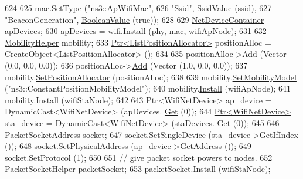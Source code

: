 \begin{DoxyCode}
624 
625   mac.\hyperlink{classns3_1_1WifiMacHelper_a382d8df76a1dd7007179d1963b4b6bc6}{SetType} (\textcolor{stringliteral}{"ns3::ApWifiMac"},
626                \textcolor{stringliteral}{"Ssid"}, SsidValue (ssid),
627                \textcolor{stringliteral}{"BeaconGeneration"}, \hyperlink{classns3_1_1BooleanValue}{BooleanValue} (\textcolor{keyword}{true}));
628 
629   \hyperlink{classns3_1_1NetDeviceContainer}{NetDeviceContainer} apDevices;
630   apDevices = wifi.\hyperlink{classns3_1_1WifiHelper_a451b3d33fa1497c22f06c5451f57a127}{Install} (phy, mac, wifiApNode);
631 
632   \hyperlink{classns3_1_1MobilityHelper}{MobilityHelper} mobility;
633   \hyperlink{classns3_1_1Ptr}{Ptr<ListPositionAllocator>} positionAlloc = CreateObject<ListPositionAllocator> 
      ();
634 
635   positionAlloc->\hyperlink{classns3_1_1ListPositionAllocator_a460e82f015ac012a73ba0ea0cccb3486}{Add} (Vector (0.0, 0.0, 0.0));
636   positionAlloc->\hyperlink{classns3_1_1ListPositionAllocator_a460e82f015ac012a73ba0ea0cccb3486}{Add} (Vector (1.0, 0.0, 0.0));
637   mobility.\hyperlink{classns3_1_1MobilityHelper_ac59d5295076be3cc11021566713a28c5}{SetPositionAllocator} (positionAlloc);
638 
639   mobility.\hyperlink{classns3_1_1MobilityHelper_a030275011b6f40682e70534d30280aba}{SetMobilityModel} (\textcolor{stringliteral}{"ns3::ConstantPositionMobilityModel"});
640   mobility.\hyperlink{classns3_1_1MobilityHelper_a07737960ee95c0777109cf2994dd97ae}{Install} (wifiApNode);
641   mobility.\hyperlink{classns3_1_1MobilityHelper_a07737960ee95c0777109cf2994dd97ae}{Install} (wifiStaNode);
642 
643   \hyperlink{classns3_1_1Ptr}{Ptr<WifiNetDevice>} ap\_device = DynamicCast<WifiNetDevice> (apDevices.
      \hyperlink{classns3_1_1NetDeviceContainer_a677d62594b5c9d2dea155cc5045f4d0b}{Get} (0));
644   \hyperlink{classns3_1_1Ptr}{Ptr<WifiNetDevice>} sta\_device = DynamicCast<WifiNetDevice> (staDevices.
      \hyperlink{classns3_1_1NetDeviceContainer_a677d62594b5c9d2dea155cc5045f4d0b}{Get} (0));
645 
646   \hyperlink{classns3_1_1PacketSocketAddress}{PacketSocketAddress} socket;
647   socket.\hyperlink{classns3_1_1PacketSocketAddress_ad1caa016f4d27c9d5f2c06dbfc53f8a3}{SetSingleDevice} (sta\_device->GetIfIndex ());
648   socket.SetPhysicalAddress (ap\_device->\hyperlink{classns3_1_1WifiNetDevice_a77fc34ff26c7af715b8ad1050aeb90ea}{GetAddress} ());
649   socket.SetProtocol (1);
650 
651   \textcolor{comment}{// give packet socket powers to nodes.}
652   \hyperlink{classns3_1_1PacketSocketHelper}{PacketSocketHelper} packetSocket;
653   packetSocket.\hyperlink{classns3_1_1PacketSocketHelper_a33f449fee7fd10411949d17feba6d33e}{Install} (wifiStaNode);

\end{DoxyCode}
